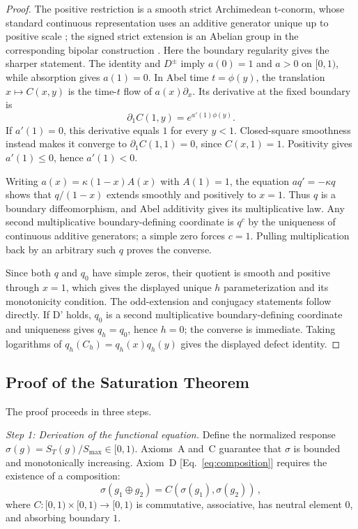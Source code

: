 \documentclass[aps,prd,twocolumn,superscriptaddress,nofootinbib]{revtex4-2}
\begin{document}
\begin{proof}
The positive restriction is a smooth strict Archimedean t-conorm, whose standard continuous representation uses an additive generator unique up to positive scale \cite{MesiarovaZemankova2015}; the signed strict extension is an Abelian group in the corresponding bipolar construction \cite{Grabisch2009}. Here the boundary regularity gives the sharper statement. The identity and $D^\pm$ imply $a(0)=1$ and $a>0$ on $[0,1)$, while absorption gives $a(1)=0$. In Abel time $t=\phi(y)$, the translation $x\mapsto C(x,y)$ is the time-$t$ flow of $a(x)\partial_x$. Its derivative at the fixed boundary is
\[
 \partial_1C(1,y)=e^{a'(1)\phi(y)}.
\]
If $a'(1)=0$, this derivative equals $1$ for every $y<1$. Closed-square smoothness instead makes it converge to $\partial_1C(1,1)=0$, since $C(x,1)=1$. Positivity gives $a'(1)\leq0$, hence $a'(1)<0$.

Writing $a(x)=\kappa(1-x)A(x)$ with $A(1)=1$, the equation $a q'=-\kappa q$ shows that $q/(1-x)$ extends smoothly and positively to $x=1$. Thus $q$ is a boundary diffeomorphism, and Abel additivity gives its multiplicative law. Any second multiplicative boundary-defining coordinate is $q^c$ by the uniqueness of continuous additive generators; a simple zero forces $c=1$. Pulling multiplication back by an arbitrary such $q$ proves the converse.

Since both $q$ and $q_0$ have simple zeros, their quotient is smooth and positive through $x=1$, which gives the displayed unique $h$ parameterization and its monotonicity condition. The odd-extension and conjugacy statements follow directly. If D' holds, $q_0$ is a second multiplicative boundary-defining coordinate and uniqueness gives $q_h=q_0$, hence $h=0$; the converse is immediate. Taking logarithms of $q_h(C_h)=q_h(x)q_h(y)$ gives the displayed defect identity.
\end{proof}

\subsection{Proof of the Saturation Theorem}

The proof proceeds in three steps.

\textit{Step 1: Derivation of the functional equation.}
Define the normalized response $\sigma(g) = S_T(g)/S_{\max} \in [0, 1)$. Axioms~A and~C guarantee that $\sigma$ is bounded and monotonically increasing. Axiom~D [Eq.~\eqref{eq:composition}] requires the existence of a composition:
\begin{equation}
\sigma(g_1 \oplus g_2) = C(\sigma(g_1), \sigma(g_2))\,,
\label{eq:normalized_composition}
\end{equation}
where $C: [0,1) \times [0,1) \to [0,1)$ is commutative, associative, has neutral element $0$, and absorbing boundary $1$.
\end{document}
